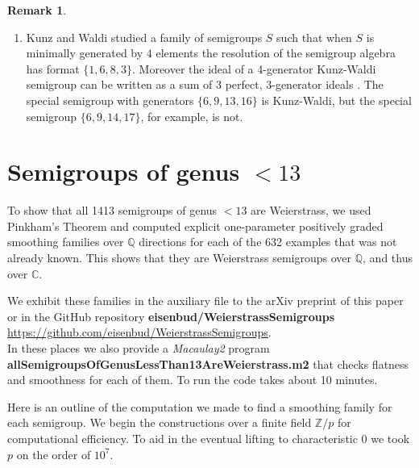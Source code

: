 \documentclass[twoside,12pt, leqno]{amsart}
\theoremstyle{definition}
\newtheorem{remark}[theorem]{Remark}
\def\QQ{{\mathbb Q}}
\def\CC{{\mathbb C}}
\def\ZZ{{\mathbb Z}}
\begin{document}
\begin{remark}
\begin{enumerate}
\medbreak
 \item Kunz and Waldi \cite{MR3621681} studied a family of semigroups $S$ such that when $S$ is minimally generated
 by 4 elements the resolution of the semigroup algebra has format 
 $\{1,6,8,3\}$. Moreover the ideal of a 4-generator Kunz-Waldi semigroup can be written as a sum of 3 perfect, 3-generator ideals \cite[Sect. 4.1]{singh2024}. The special semigroup with generators $\{6,9,13,16\}$ is Kunz-Waldi, 
 but the special semigroup $\{6, 9, 14,17\}$, for example, is not.
 
\end{enumerate}

\end{remark}

\section{Semigroups of genus $<13$}\label{comp}

To show that all 1413 semigroups of genus $<13$ are Weierstrass, we used
Pinkham's Theorem  \cite{MR376672} and 
 computed explicit one-parameter positively graded smoothing families  over $\QQ$ directions for each of the 632 examples that was not already known. This shows that they are Weierstrass semigroups over $\QQ$, and thus over $\CC$. 

We exhibit these families in the auxiliary file to the arXiv preprint of this paper  
or in the GitHub repository {\bf eisenbud/WeierstrassSemigroups} \url{https://github.com/eisenbud/WeierstrassSemigroups}. \\
In these places we also provide a {\it Macaulay2} program  {\bf 
allSemigroupsOfGe\-nusLessThan13AreWeierstrass.m2} that checks  flatness and smoothness for each of them. To run the code takes about 10 minutes.

Here is an outline of the computation we made to find a smoothing family for each semigroup. We begin the constructions over a finite field $\ZZ/p$ for computational efficiency. To aid in the eventual lifting to characteristic 0 we took $p$ on the order of $10^{7}$.
\end{document}
